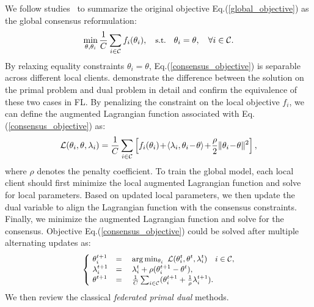 We follow studies~\citep{zhang2021fedpd,durmus2021federated,wang2022fedadmm,gong2022fedadmm,sun2023fedspeed,zhou2023federated,sun2023dynamic,fan2023federated,zhang2024domain} to summarize the original objective Eq.(\ref{global_objective}) as the global consensus reformulation:
\begin{equation}
\label{consensus_objective}
\small
    \min_{\theta,\theta_i} \frac{1}{C}\sum_{i\in\mathcal{C}}f_i(\theta_i), \quad \text{s.t.} \quad \theta_i=\theta, \quad \forall i\in\mathcal{C}.
\end{equation}
By relaxing equality constraints $\theta_i=\theta$, Eq.(\ref{consensus_objective}) is separable across different local clients. \citet{wang2022fedadmm} demonstrate the difference between the solution on the primal problem and dual problem in detail and confirm the equivalence of these two cases in FL. By penalizing the constraint on the local objective $f_i$, we can define the augmented Lagrangian function associated with Eq.(\ref{consensus_objective}) as:
\begin{equation}
\label{lagrangian}
\small
    \mathcal{L} (\theta_i,\theta,\lambda_i) = \frac{1}{C}\sum_{i\in\mathcal{C}}\left[f_i(\theta_i)\!+\!\langle\lambda_i, \theta_i\!-\!\theta\rangle \!+\! \frac{\rho}{2}\Vert\theta_i\!-\!\theta\Vert^2\right],
\end{equation}
where $\rho$ denotes the penalty coefficient. To train the global model, each local client should first minimize the local augmented Lagrangian function and solve for local parameters. Based on updated local parameters, we then update the dual variable to align the Lagrangian function with the consensus constraints. Finally, we minimize the augmented Lagrangian function and solve for the consensus. Objective Eq.(\ref{consensus_objective}) could be solved after multiple alternating updates as:
\begin{eqnarray}
\label{FedPD}
\small
\begin{cases}
\ \theta_i^{t+1} & = \quad \arg\min_{\theta_i} \ \mathcal{L} (\theta_i^t,\theta^t,\lambda_i^t) \quad i\in\mathcal{C}, \\
\ \lambda_i^{t+1} & =\quad \lambda_i^{t} + \rho(\theta_i^{t+1} - \theta^{t}), \\
\ \theta^{t+1} & =\quad \frac{1}{C}\sum_{i\in\mathcal{C}}(\theta_i^{t+1} + \frac{1}{\rho}\lambda_i^{t+1}).\\
\end{cases}
\end{eqnarray}
We then review the classical \textit{federated primal dual} methods.

